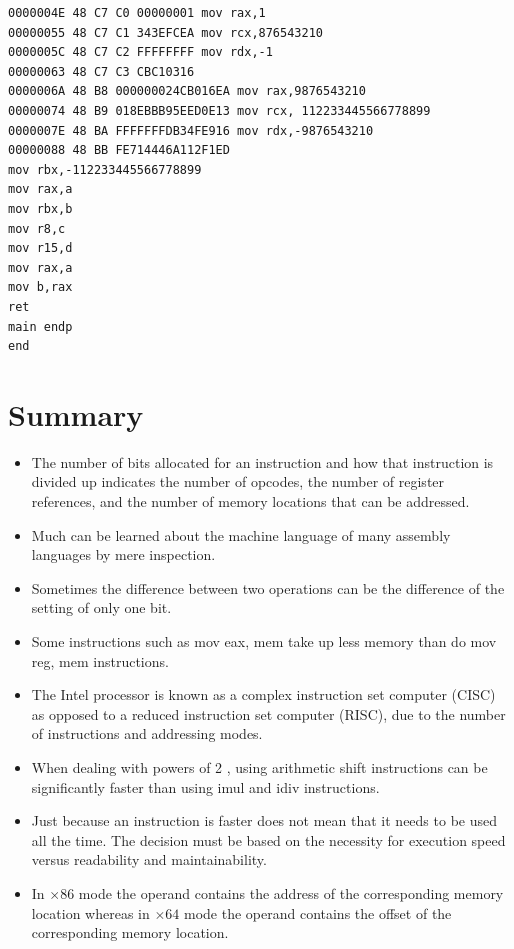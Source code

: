 \documentclass[10pt]{book}
\begin{document}
\begin{verbatim}
0000004E 48 C7 C0 00000001 mov rax,1
00000055 48 C7 C1 343EFCEA mov rcx,876543210
0000005C 48 C7 C2 FFFFFFFF mov rdx,-1
00000063 48 C7 C3 CBC10316
0000006A 48 B8 000000024CB016EA mov rax,9876543210
00000074 48 B9 018EBBB95EED0E13 mov rcx, 112233445566778899
0000007E 48 BA FFFFFFFDB34FE916 mov rdx,-9876543210
00000088 48 BB FE714446A112F1ED
mov rbx,-112233445566778899
mov rax,a
mov rbx,b
mov r8,c
mov r15,d
mov rax,a
mov b,rax
ret
main endp
end
\end{verbatim}

\section{Summary}
\begin{itemize}
  \item The number of bits allocated for an instruction and how that instruction is divided up indicates the number of opcodes, the number of register references, and the number of memory locations that can be addressed.
  \item Much can be learned about the machine language of many assembly languages by mere inspection.
  \item Sometimes the difference between two operations can be the difference of the setting of only one bit.
  \item Some instructions such as mov eax, mem take up less memory than do mov reg, mem instructions.
  \item The Intel processor is known as a complex instruction set computer (CISC) as opposed to a reduced instruction set computer (RISC), due to the number of instructions and addressing modes.
  \item When dealing with powers of 2 , using arithmetic shift instructions can be significantly faster than using imul and idiv instructions.
  \item Just because an instruction is faster does not mean that it needs to be used all the time. The decision must be based on the necessity for execution speed versus readability and maintainability.
  \item In $\times 86$ mode the operand contains the address of the corresponding memory location whereas in $\times 64$ mode the operand contains the offset of the corresponding memory location.
\end{itemize}
\end{document}

